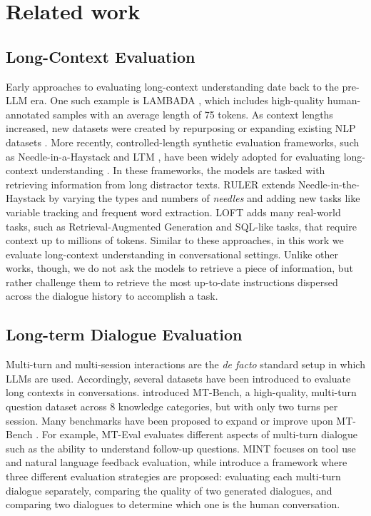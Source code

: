 \section{Related work}
\label{sec:related}

\subsection{Long-Context Evaluation} 
Early approaches to evaluating long-context understanding date back to the pre-LLM era.
One such example is 
LAMBADA \citep{paperno-etal-2016-lambada}, which includes high-quality human-annotated samples with an average length of 75 tokens. 
As context lengths increased, new datasets were created by repurposing or expanding existing NLP datasets \citep{an-etal-2024-l, bai-etal-2024-longbench, dong-etal-2024-bamboo}. 
More recently, controlled-length synthetic evaluation frameworks, such as Needle-in-a-Haystack \cite{kamradt2023needle} and LTM \cite{LMT}, have been widely adopted for evaluating long-context understanding \citep{anil2023gemini, anthropic2024claude3}. 
In these frameworks, the %
models are
tasked with retrieving information from long distractor texts.
RULER \citep{hsieh2024ruler} extends Needle-in-the-Haystack by varying the types and numbers of \textit{needles} and adding new tasks like variable tracking and frequent word extraction.
LOFT \citep{lee2024can} adds many real-world tasks, such as Retrieval-Augmented Generation and SQL-like tasks, that require context up to millions of tokens. 
Similar to these approaches, in this work we evaluate long-context understanding in conversational settings. Unlike
other works, though,
we do not ask the models to retrieve a piece of information, but rather challenge them to retrieve 
the most up-to-date instructions dispersed across the dialogue history to accomplish a task.\\


\subsection{Long-term Dialogue Evaluation}
Multi-turn and multi-session interactions are the \textit{de facto} standard setup in which LLMs are used. Accordingly, several datasets have been introduced to evaluate long contexts in conversations.
\citealp{zheng2024judging} introduced MT-Bench, a high-quality, multi-turn question dataset across 8 knowledge categories, but with only two turns per session. 
Many benchmarks have been proposed to expand or improve upon MT-Bench \citep{sun2024parrot, bai-etal-2024-mt, kwan2024mt}. 
For example, MT-Eval \citep{kwan2024mt} evaluates different aspects of multi-turn dialogue such as the ability to understand follow-up questions.
MINT \citep{wang2024mint} focuses on tool use and natural language feedback evaluation, while \citealp{duan-etal-2024-botchat} introduce a framework where three different evaluation strategies are proposed: evaluating each multi-turn dialogue separately, comparing the quality of two generated dialogues, and comparing two dialogues to determine which one is 
the human
conversation. 


